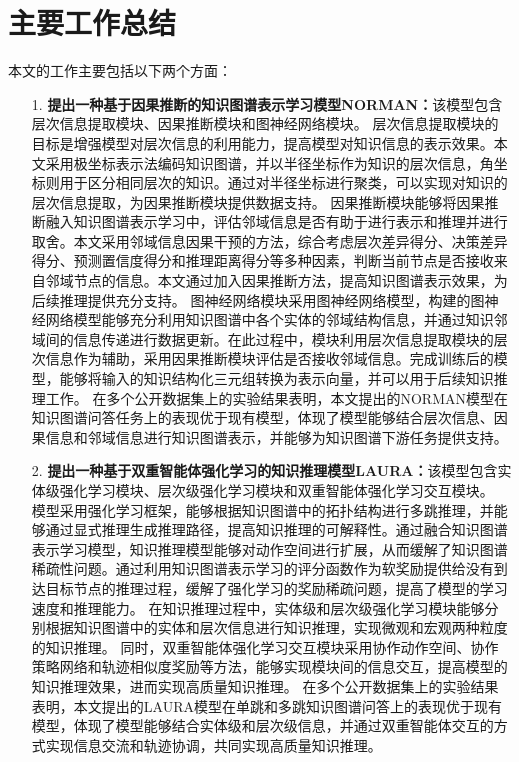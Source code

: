 \documentclass[algorithmlist, AutoFakeBold, AutoFakeSlant, figurelist, tablelist, nomlist, engineering]{seuthesix}
\begin{document}
\section{主要工作总结}
本文的工作主要包括以下两个方面：
\begin{itemize}
  \item [1.]\textbf{提出一种基于因果推断的知识图谱表示学习模型NORMAN：}该模型包含层次信息提取模块、因果推断模块和图神经网络模块。
  层次信息提取模块的目标是增强模型对层次信息的利用能力，提高模型对知识信息的表示效果。本文采用极坐标表示法编码知识图谱，并以半径坐标作为知识的层次信息，角坐标则用于区分相同层次的知识。通过对半径坐标进行聚类，可以实现对知识的层次信息提取，为因果推断模块提供数据支持。
  因果推断模块能够将因果推断融入知识图谱表示学习中，评估邻域信息是否有助于进行表示和推理并进行取舍。本文采用邻域信息因果干预的方法，综合考虑层次差异得分、决策差异得分、预测置信度得分和推理距离得分等多种因素，判断当前节点是否接收来自邻域节点的信息。本文通过加入因果推断方法，提高知识图谱表示效果，为后续推理提供充分支持。
  图神经网络模块采用图神经网络模型，构建的图神经网络模型能够充分利用知识图谱中各个实体的邻域结构信息，并通过知识邻域间的信息传递进行数据更新。在此过程中，模块利用层次信息提取模块的层次信息作为辅助，采用因果推断模块评估是否接收邻域信息。完成训练后的模型，能够将输入的知识结构化三元组转换为表示向量，并可以用于后续知识推理工作。
  在多个公开数据集上的实验结果表明，本文提出的NORMAN模型在知识图谱问答任务上的表现优于现有模型，体现了模型能够结合层次信息、因果信息和邻域信息进行知识图谱表示，并能够为知识图谱下游任务提供支持。
  \item [2.]\textbf{提出一种基于双重智能体强化学习的知识推理模型LAURA：}该模型包含实体级强化学习模块、层次级强化学习模块和双重智能体强化学习交互模块。
  模型采用强化学习框架，能够根据知识图谱中的拓扑结构进行多跳推理，并能够通过显式推理生成推理路径，提高知识推理的可解释性。通过融合知识图谱表示学习模型，知识推理模型能够对动作空间进行扩展，从而缓解了知识图谱稀疏性问题。通过利用知识图谱表示学习的评分函数作为软奖励提供给没有到达目标节点的推理过程，缓解了强化学习的奖励稀疏问题，提高了模型的学习速度和推理能力。
  在知识推理过程中，实体级和层次级强化学习模块能够分别根据知识图谱中的实体和层次信息进行知识推理，实现微观和宏观两种粒度的知识推理。
  同时，双重智能体强化学习交互模块采用协作动作空间、协作策略网络和轨迹相似度奖励等方法，能够实现模块间的信息交互，提高模型的知识推理效果，进而实现高质量知识推理。
  在多个公开数据集上的实验结果表明，本文提出的LAURA模型在单跳和多跳知识图谱问答上的表现优于现有模型，体现了模型能够结合实体级和层次级信息，并通过双重智能体交互的方式实现信息交流和轨迹协调，共同实现高质量知识推理。
\end{itemize}
\end{document}
